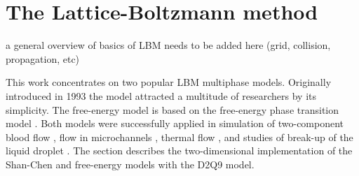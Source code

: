 \documentclass[mathpazo]{cicp}
\begin{document}
\section{The Lattice-Boltzmann method}

{\color{red} a general overview of basics of LBM needs to be added here (grid, collision, propagation, etc)}

\label{sec:lbm:binary:liquids}
This work concentrates on two popular LBM multiphase models. Originally introduced
in 1993 \cite{Shan-chen:extended} the model attracted a multitude of researchers
by its simplicity.  The free-energy model \cite{swift} is based on the free-energy
phase transition model \cite{landau}. Both models were successfully applied in simulation
of two-component blood flow \cite{halliday-multicomponent}, flow in microchannels
\cite{pooley-contact}, thermal flow \cite{zhang-thermal}, and studies of break-up
of the liquid droplet \cite{nourgaliev-breakup}. The section describes the
two-dimensional implementation of the Shan-Chen and free-energy models with
the D2Q9 model. 
\end{document}
